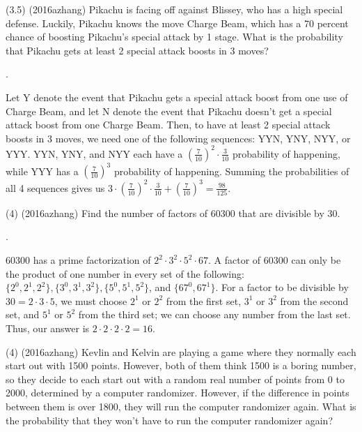 \documentclass[11pt]{article}
\begin{document}
\begin{problem}
(3.5) (2016azhang) Pikachu is facing off against Blissey, who has a high special defense. Luckily, Pikachu knows the move Charge Beam, which has a 70 percent chance of boosting Pikachu's special attack by 1 stage. What is the probability that Pikachu gets at least 2 special attack boosts in 3 moves?
\end{problem}

\begin{answer}
.
\end{answer}

\begin{solution}
Let Y denote the event that Pikachu gets a special attack boost from one use of Charge Beam, and let N denote the event that Pikachu doesn't get a special attack boost from one Charge Beam. Then, to have at least 2 special attack boosts in 3 moves, we need one of the following sequences: YYN, YNY, NYY, or YYY. YYN, YNY, and NYY each have a $(\frac{7}{10})^2\cdot\frac{3}{10}$ probability of happening, while YYY has a $(\frac{7}{10})^3$ probability of happening. Summing the probabilities of all 4 sequences gives us $3\cdot(\frac{7}{10})^2\cdot\frac{3}{10} + (\frac{7}{10})^3 = \boxed{\frac{98}{125}}$.
\end{solution}

\begin{problem}
(4) (2016azhang) Find the number of factors of 60300 that are divisible by 30.
\end{problem}

\begin{answer}
.
\end{answer}

\begin{solution}
60300 has a prime factorization of $2^2\cdot3^2\cdot5^2\cdot67$. A factor of 60300 can only be the product of one number in every set of the following: $\{2^0, 2^1, 2^2\}, \{3^0, 3^1, 3^2\}, \{5^0, 5^1, 5^2\}$, and $\{67^0, 67^1\}$. For a factor to be divisible by $30 = 2\cdot3\cdot5$, we must choose $2^1$ or $2^2$ from the first set, $3^1$ or $3^2$ from the second set, and $5^1$ or $5^2$ from the third set; we can choose any number from the last set. Thus, our answer is $2\cdot2\cdot2\cdot2 = 16$.
\end{solution}

\begin{problem}
(4) (2016azhang) Kevlin and Kelvin are playing a game where they normally each start out with 1500 points. However, both of them think 1500 is a boring number, so they decide to each start out with a random real number of points from 0 to 2000, determined by a computer randomizer. However, if the difference in points between them is over 1800, they will run the computer randomizer again. What is the probability that they won't have to run the computer randomizer again? 
\end{problem}
\end{document}
